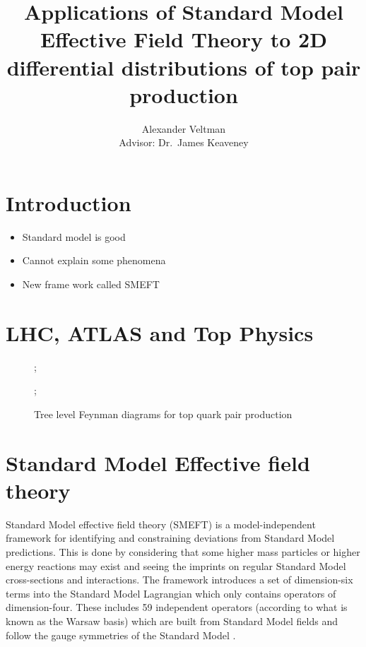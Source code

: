 \documentclass[a4paper]{article}
\title{Applications of Standard Model Effective Field Theory to 2D differential distributions of top pair production}
\author{Alexander Veltman\\{\small Advisor: Dr.\ James Keaveney}}
\affil{Department of Physics,\\University of Cape Town}
\begin{document}
\maketitle

\begin{abstract}
\end{abstract}

\section{Introduction}

\begin{itemize}
    \item Standard model is good
    \item Cannot explain some phenomena
    \item New frame work called SMEFT
\end{itemize}

\section{LHC, ATLAS and Top Physics}

\begin{figure}[h]
    \centering
    ;

    ;
    \caption{Tree level Feynman diagrams for top quark pair production}
\end{figure}


\section{Standard Model Effective field theory}

Standard Model effective field theory (SMEFT) is a model-independent framework for identifying and constraining deviations from Standard Model predictions.
This is done by considering that some higher mass particles or higher energy reactions may exist and seeing the imprints on regular Standard Model cross-sections and interactions.
The framework introduces a set of dimension-six terms into the Standard Model Lagrangian which only contains operators of dimension-four.
These includes 59 independent operators (according to what is known as the Warsaw basis) which are built from Standard Model fields and follow the gauge symmetries of the Standard Model \cite{Grzadkowski_2010}.
\end{document}
